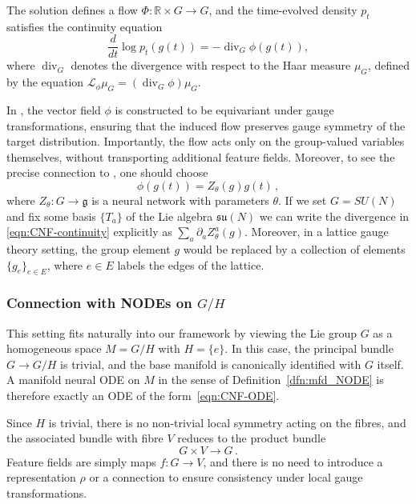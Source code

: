 \documentclass[12pt,a4paper]{article}
\numberwithin{equation}{section}
\newcommand{\R}{\mathbb{R}}
\theoremstyle{plain}
\theoremstyle{definition}
\theoremstyle{remark}
\begin{document}
The solution defines a flow $\Phi : \R \times G \to G$, and the time-evolved density $p_t$ satisfies the continuity equation
\begin{equation}\label{eqn:CNF-continuity}
    \frac{d}{dt} \log p_t(g(t)) = - \operatorname{div}_G \phi(g(t)),
\end{equation}
where $\operatorname{div}_G$ denotes the divergence with respect to the Haar measure $\mu_G$, defined by the equation $\mathcal{L}_{\phi}\mu_G = (\operatorname{div}_G \phi)\mu_G$.

In \cite{Gerdes2024}, the vector field $\phi$ is constructed to be equivariant under gauge transformations, ensuring that the induced flow preserves gauge symmetry of the target distribution. Importantly, the flow acts only on the group-valued variables themselves, without transporting additional feature fields. Moreover, to see the precise connection to \cite{Gerdes2024}, one should choose 
\begin{equation}  
    \phi(g(t))=Z_\theta(g)g(t)\,,
\end{equation}
where $Z_\theta : G \to \mathfrak{g}$ is a neural network with parameters $\theta$. If we set $G=SU(N)$ and fix some basis $\{T_a\}$ of the Lie algebra $\mathfrak{su}(N)$ we can write the divergence in \ref{eqn:CNF-continuity} explicitly as $\sum_a \partial_a Z^{a}_\theta(g)$. Moreover, in a lattice gauge theory setting, the group element $g$ would be replaced by a collection of elements $\{g_e\}_{e\in E}$, where $e \in E$ labels the edges of the lattice.

\subsubsection{Connection with NODEs on $G/H$}
This setting fits naturally into our framework by viewing the Lie group $G$ as a homogeneous space $M = G/H$ with $H = \{e\}$. In this case, the principal bundle $G \to G/H$ is trivial, and the base manifold is canonically identified with $G$ itself. A manifold neural ODE on $M$ in the sense of Definition~\ref{dfn:mfd_NODE} is therefore exactly an ODE of the form~\eqref{eqn:CNF-ODE}.

Since $H$ is trivial, there is no non-trivial local symmetry acting on the fibres, and the associated bundle with fibre $V$ reduces to the product bundle
\begin{equation}
G \times V \to G\,.
\end{equation}
Feature fields are simply maps $f : G \to V$, and there is no need to introduce a representation $\rho$ or a connection to ensure consistency under local gauge transformations.
\end{document}
